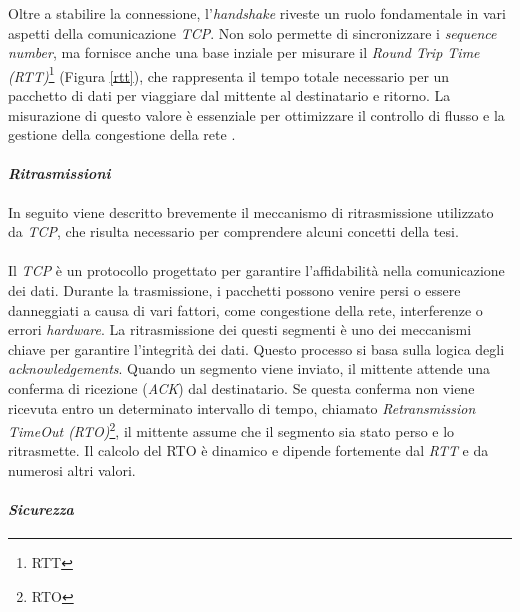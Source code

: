 \noindent Oltre a stabilire la connessione, l'\emph{handshake} riveste un ruolo fondamentale in vari aspetti della comunicazione \emph{TCP}.
Non solo permette di sincronizzare i \emph{sequence number}, ma fornisce anche una base inziale per misurare il \emph{Round Trip Time (RTT)}\footnote{\gls{RTT}} (Figura \ref{rtt}), che rappresenta il tempo totale necessario per un pacchetto di dati per viaggiare dal mittente al destinatario e ritorno. La misurazione di questo valore è essenziale per ottimizzare il controllo di flusso e la gestione della congestione della rete \cite{site:tcp}.

\paragraph{\textit{Ritrasmissioni}}

\noindent In seguito viene descritto brevemente il meccanismo di ritrasmissione utilizzato da \emph{TCP}, che risulta necessario per comprendere alcuni concetti della tesi.
\\\\
\noindent Il \emph{TCP} è un protocollo progettato per garantire l'affidabilità nella comunicazione dei dati. Durante la trasmissione, i pacchetti possono venire persi o essere danneggiati a causa di vari fattori, come congestione della rete, interferenze o errori \emph{hardware}.
La ritrasmissione dei questi segmenti è uno dei meccanismi chiave per garantire l'integrità dei dati. Questo processo si basa sulla logica degli \emph{acknowledgements}. Quando un segmento viene inviato, il mittente attende una conferma di ricezione (\emph{ACK}) dal destinatario. Se questa conferma non viene ricevuta entro un determinato intervallo di tempo, chiamato \emph{Retransmission TimeOut (RTO)}\footnote{\gls{RTO}}, il mittente assume che il segmento sia stato perso e lo ritrasmette.
Il calcolo del RTO è dinamico e dipende fortemente dal \emph{RTT} e da numerosi altri valori. 
\paragraph{\textit{Sicurezza}}

